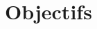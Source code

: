 \documentclass[final,twoside,article,10pt]{scrartcl}
\begin{document}
\section*{Objectifs}


\end{document}
